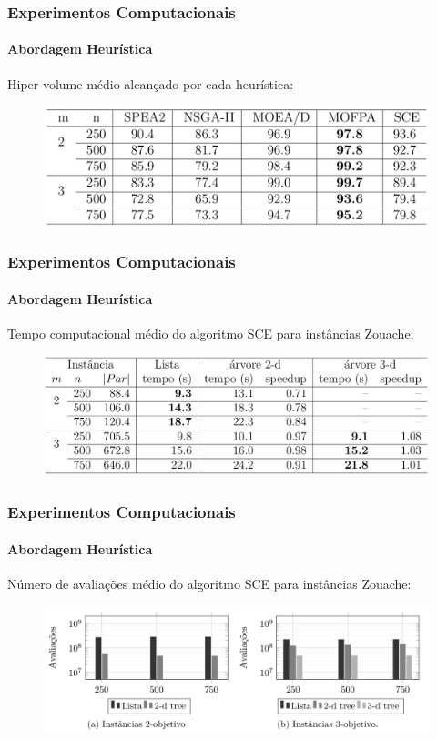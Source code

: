 \documentclass[10pt,xcolor=table,fleqn]{beamer}
\begin{document}
\begin{frame}
  \frametitle{Experimentos Computacionais}
  \framesubtitle{Abordagem Heurística}
  Hiper-volume médio alcançado por cada heurística:
  \begin{figure}
    \centering
    \includegraphics[width=1.0\textwidth]{../tab/sce/zitzler-hvol}
  \end{figure}
\end{frame}

\begin{frame}
  \frametitle{Experimentos Computacionais}
  \framesubtitle{Abordagem Heurística}
  Tempo computacional médio do algoritmo SCE para instâncias Zouache:
  \begin{figure}
    \centering
    \includegraphics[width=1.0\textwidth]{../tab/sce/cpures}
  \end{figure}
\end{frame}

\begin{frame}
  \frametitle{Experimentos Computacionais}
  \framesubtitle{Abordagem Heurística}
  Número de avaliações médio do algoritmo SCE para instâncias Zouache:
  \begin{figure}
    \centering
    \includegraphics[width=1.0\textwidth]{../tab/sce/cmpres}
  \end{figure}
\end{frame}
\end{document}
